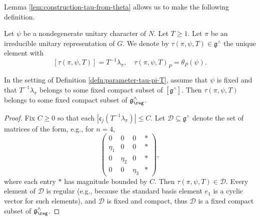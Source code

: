 Lemma \ref{lem:construction-tau-from-theta} allows us to make the following definition.
\begin{definition}\label{defn:parameter-tau-pi-T}
  Let $\psi$ be a nondegenerate unitary character of $N$.  Let $T \geq 1$.  Let $\pi$ be an irreducible unitary representation of $G$.  We denote by $\tau(\pi,\psi,T) \in \mathfrak{g}^\wedge$ the unique element with 
  \begin{equation}\label{eq:tau-characterize-via-pi}
    [\tau(\pi,\psi,T)] = T^{-1} \lambda_\pi,
    \quad
    \tau(\pi,\psi,T)_P = \theta_P(\psi).
  \end{equation}
\end{definition}


\begin{lemma}
  In the setting of Definition \ref{defn:parameter-tau-pi-T}, assume that $\psi$ is fixed and that $T^{-1} \lambda_\pi$ belongs to some fixed compact subset of $[\mathfrak{g}^\wedge]$.  Then $\tau(\pi,\psi,T)$ belongs to some fixed compact subset of $\mathfrak{g}^\wedge_{\reg}$.
\end{lemma}
\begin{proof}
  Fix $C \geq 0$ so that each $|\mathfrak{c}_j (T^{-1} \lambda_\pi)| \leq C$.  Let $\mathcal{D} \subseteq \mathfrak{g}^\wedge$ denote the set of matrices of the form, e.g., for $n=4$,
  \begin{equation*}
    \begin{pmatrix}
      0 & 0 & 0 & \ast \\
      \eta_1  & 0 & 0 & \ast \\
      0 & \eta_2  & 0 & \ast \\
      0 & 0 & \eta_3  &  \ast
    \end{pmatrix},
  \end{equation*}
  where each entry $\ast$ has magnitude bounded by $C$.  Then $\tau(\pi,\psi,T) \in \mathcal{D}$.   Every element of $\mathcal{D}$ is regular (e.g., because the standard basis element $e_1$ is a cyclic vector for such elements), and $\mathcal{D}$ is fixed and compact, thus $\mathcal{D}$ is a fixed compact subset of $\mathfrak{g}^\wedge_{\reg}$.
\end{proof}

